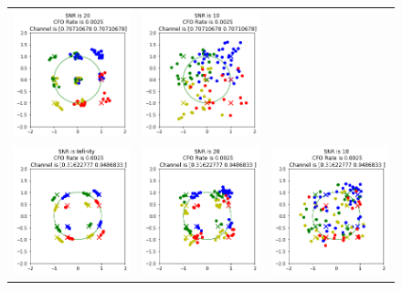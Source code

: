 \begin{figure}
\begin{tabular}{ccc}
    \includegraphics[width=45mm]{figures/cfo_equal_intro/snr_20_c2/cfo_0.png}&
    \includegraphics[width=45mm]{figures/cfo_equal_intro/snr_10_c2/cfo_0.png}\\
    \includegraphics[width=45mm]{figures/cfo_equal_intro/snr_0_c4/cfo_0.png}&
    \includegraphics[width=45mm]{figures/cfo_equal_intro/snr_20_c4/cfo_0.png}&
    \includegraphics[width=45mm]{figures/cfo_equal_intro/snr_10_c4/cfo_0.png}\\

\end{tabular}
\end{figure}
